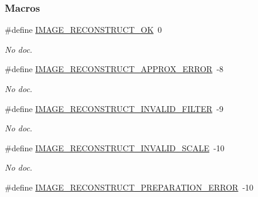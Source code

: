 \subsubsection*{Macros}
\begin{DoxyCompactItemize}
\item 
\hypertarget{a00013_a5d3e11bd9c9b216b7b19bd842ef654ad}{\#define \hyperlink{a00013_a5d3e11bd9c9b216b7b19bd842ef654ad}{I\-M\-A\-G\-E\-\_\-\-R\-E\-C\-O\-N\-S\-T\-R\-U\-C\-T\-\_\-\-O\-K}~0}\label{a00013_a5d3e11bd9c9b216b7b19bd842ef654ad}

\begin{DoxyCompactList}\small\item\em No doc. \end{DoxyCompactList}\item 
\hypertarget{a00013_a52a36b669da74ad6d52f3879879b37fd}{\#define \hyperlink{a00013_a52a36b669da74ad6d52f3879879b37fd}{I\-M\-A\-G\-E\-\_\-\-R\-E\-C\-O\-N\-S\-T\-R\-U\-C\-T\-\_\-\-A\-P\-P\-R\-O\-X\-\_\-\-E\-R\-R\-O\-R}~-\/8}\label{a00013_a52a36b669da74ad6d52f3879879b37fd}

\begin{DoxyCompactList}\small\item\em No doc. \end{DoxyCompactList}\item 
\hypertarget{a00013_a9a3201c26690e3b1784471c3597ed111}{\#define \hyperlink{a00013_a9a3201c26690e3b1784471c3597ed111}{I\-M\-A\-G\-E\-\_\-\-R\-E\-C\-O\-N\-S\-T\-R\-U\-C\-T\-\_\-\-I\-N\-V\-A\-L\-I\-D\-\_\-\-F\-I\-L\-T\-E\-R}~-\/9}\label{a00013_a9a3201c26690e3b1784471c3597ed111}

\begin{DoxyCompactList}\small\item\em No doc. \end{DoxyCompactList}\item 
\hypertarget{a00013_abb31cd9e335e681f67536b4b7424fa99}{\#define \hyperlink{a00013_abb31cd9e335e681f67536b4b7424fa99}{I\-M\-A\-G\-E\-\_\-\-R\-E\-C\-O\-N\-S\-T\-R\-U\-C\-T\-\_\-\-I\-N\-V\-A\-L\-I\-D\-\_\-\-S\-C\-A\-L\-E}~-\/10}\label{a00013_abb31cd9e335e681f67536b4b7424fa99}

\begin{DoxyCompactList}\small\item\em No doc. \end{DoxyCompactList}\item 
\hypertarget{a00013_aed253771c228720c23e0ce46c777b561}{\#define \hyperlink{a00013_aed253771c228720c23e0ce46c777b561}{I\-M\-A\-G\-E\-\_\-\-R\-E\-C\-O\-N\-S\-T\-R\-U\-C\-T\-\_\-\-P\-R\-E\-P\-A\-R\-A\-T\-I\-O\-N\-\_\-\-E\-R\-R\-O\-R}~-\/10}\label{a00013_aed253771c228720c23e0ce46c777b561}


\end{DoxyCompactItemize}
